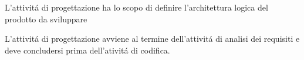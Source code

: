L'attivit\'{a} di progettazione ha lo scopo di definire l'architettura logica del prodotto da sviluppare 

L'attivit\'{a} di progettazione avviene al termine dell'attivit\'{a} di analisi dei requisiti e deve concludersi prima dell'ativit\'{a} di codifica. 